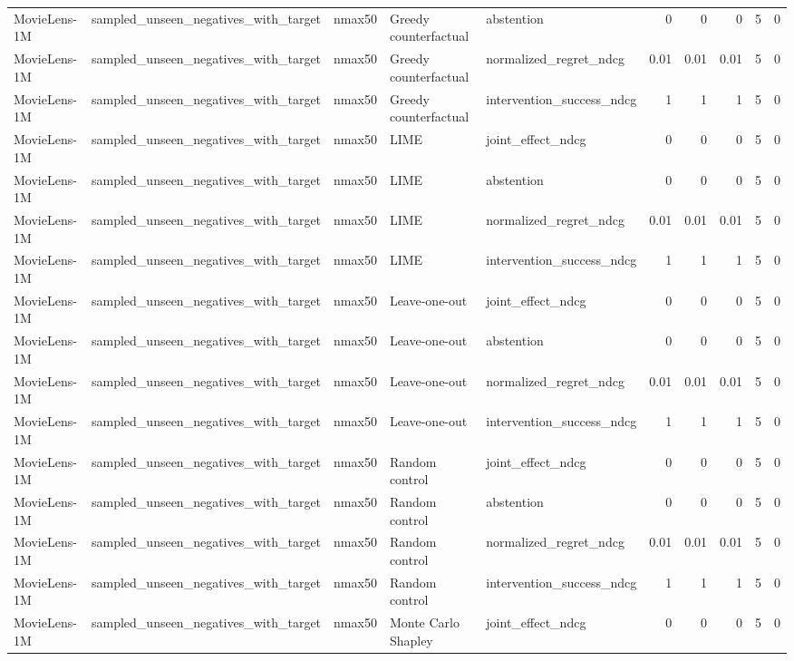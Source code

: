 \begin{table}[t]
{\begin{tabular}{lllllrrrrr}
MovieLens-1M & sampled\_unseen\_negatives\_with\_target & nmax50 & Greedy counterfactual & abstention & 0 & 0 & 0 & 5 & 0 \\
MovieLens-1M & sampled\_unseen\_negatives\_with\_target & nmax50 & Greedy counterfactual & normalized\_regret\_ndcg & 0.01 & 0.01 & 0.01 & 5 & 0 \\
MovieLens-1M & sampled\_unseen\_negatives\_with\_target & nmax50 & Greedy counterfactual & intervention\_success\_ndcg & 1 & 1 & 1 & 5 & 0 \\
MovieLens-1M & sampled\_unseen\_negatives\_with\_target & nmax50 & LIME & joint\_effect\_ndcg & 0 & 0 & 0 & 5 & 0 \\
MovieLens-1M & sampled\_unseen\_negatives\_with\_target & nmax50 & LIME & abstention & 0 & 0 & 0 & 5 & 0 \\
MovieLens-1M & sampled\_unseen\_negatives\_with\_target & nmax50 & LIME & normalized\_regret\_ndcg & 0.01 & 0.01 & 0.01 & 5 & 0 \\
MovieLens-1M & sampled\_unseen\_negatives\_with\_target & nmax50 & LIME & intervention\_success\_ndcg & 1 & 1 & 1 & 5 & 0 \\
MovieLens-1M & sampled\_unseen\_negatives\_with\_target & nmax50 & Leave-one-out & joint\_effect\_ndcg & 0 & 0 & 0 & 5 & 0 \\
MovieLens-1M & sampled\_unseen\_negatives\_with\_target & nmax50 & Leave-one-out & abstention & 0 & 0 & 0 & 5 & 0 \\
MovieLens-1M & sampled\_unseen\_negatives\_with\_target & nmax50 & Leave-one-out & normalized\_regret\_ndcg & 0.01 & 0.01 & 0.01 & 5 & 0 \\
MovieLens-1M & sampled\_unseen\_negatives\_with\_target & nmax50 & Leave-one-out & intervention\_success\_ndcg & 1 & 1 & 1 & 5 & 0 \\
MovieLens-1M & sampled\_unseen\_negatives\_with\_target & nmax50 & Random control & joint\_effect\_ndcg & 0 & 0 & 0 & 5 & 0 \\
MovieLens-1M & sampled\_unseen\_negatives\_with\_target & nmax50 & Random control & abstention & 0 & 0 & 0 & 5 & 0 \\
MovieLens-1M & sampled\_unseen\_negatives\_with\_target & nmax50 & Random control & normalized\_regret\_ndcg & 0.01 & 0.01 & 0.01 & 5 & 0 \\
MovieLens-1M & sampled\_unseen\_negatives\_with\_target & nmax50 & Random control & intervention\_success\_ndcg & 1 & 1 & 1 & 5 & 0 \\
MovieLens-1M & sampled\_unseen\_negatives\_with\_target & nmax50 & Monte Carlo Shapley & joint\_effect\_ndcg & 0 & 0 & 0 & 5 & 0 \\

\end{tabular}}
\end{table}
